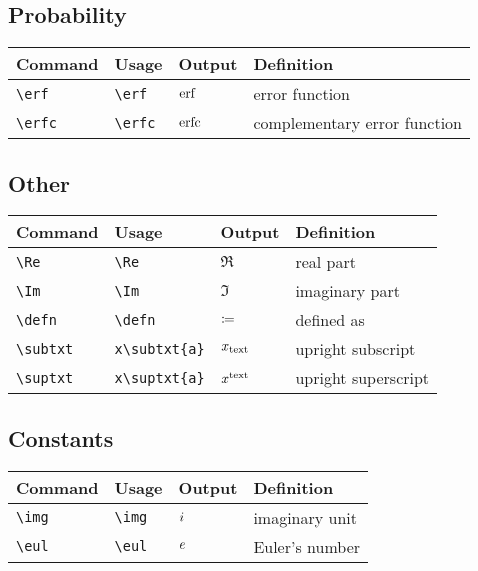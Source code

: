 \documentclass[11pt]{article}
\begin{document}
\subsection{Probability}

\begin{tabular}{llll}
    Command      & Usage        & Output  & Definition                   \\
    \hline
    \verb|\erf|  & \verb|\erf|  & $\operatorname{erf}$  & error function               \\
    \verb|\erfc| & \verb|\erfc| & $\operatorname{erfc}$ & complementary error function \\
\end{tabular}

\subsection{Other}

\begin{tabular}{llll}
    Command        & Usage              & Output           & Definition          \\
    \hline
    \verb|\Re|     & \verb|\Re|         & $\Re$            & real part           \\
    \verb|\Im|     & \verb|\Im|         & $\Im$            & imaginary part      \\
    \verb|\defn|   & \verb|\defn|       & $\coloneq$          & defined as          \\
    \verb|\subtxt| & \verb|x\subtxt{a}| & $x_{\mathrm{text}}$ & upright subscript   \\
    \verb|\suptxt| & \verb|x\suptxt{a}| & $x^{\mathrm{text}}$ & upright superscript \\
\end{tabular}

\subsection{Constants}

\begin{tabular}{llll}
    Command     & Usage       & Output & Definition     \\
    \hline
    \verb|\img| & \verb|\img| & $i$ & imaginary unit \\
    \verb|\eul| & \verb|\eul| & $e$ & Euler's number \\
\end{tabular}
\end{document}
